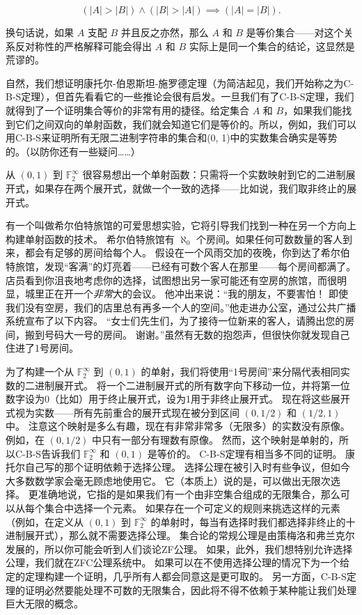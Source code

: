 \[ (|A| > |B|) \land (|B| > |A|) \implies (|A| = |B|).
\]

换句话说，如果 $A$ 支配 $B$ 并且反之亦然，那么 $A$ 和 $B$ 是等价集合——对这个关系反对称性的严格解释可能会得出 $A$ 和 $B$ 实际上是同一个集合的结论，这显然是荒谬的。

自然，我们想证明康托尔-伯恩斯坦-施罗德定理（为简洁起见，我们开始称之为C-B-S定理），但首先看看它的一些推论会很有启发。一旦我们有了C-B-S定理，我们就得到了一个证明集合等价的非常有用的捷径。给定集合 $A$ 和 $B$，如果我们能找到它们之间双向的单射函数，我们就会知道它们是等价的。所以，例如，我们可以用C-B-S来证明所有无限二进制字符串的集合和(0, 1)中的实数集合确实是等势的。（以防你还有一些疑问……）

从 $(0, 1)$ 到 ${\mathbb F}_2^\infty$ 很容易想出一个单射函数：只需将一个实数映射到它的二进制展开式，如果存在两个展开式，就做一个一致的选择——比如说，我们取非终止的展开式。

有一个叫做希尔伯特旅馆的可爱思想实验，它将引导我们找到一种在另一个方向上构建单射函数的技术。
希尔伯特旅馆有 $\aleph_0$ 个房间。如果任何可数数量的客人到来，都会有足够的房间给每个人。
假设在一个风雨交加的夜晚，你到达了希尔伯特旅馆，发现“客满”的灯亮着——已经有可数个客人在那里——每个房间都满了。
店员看到你沮丧地考虑你的选择，试图想出另一家可能还有空房的旅馆，而很明显，城里正在开一个\emph{非常}大的会议。
他冲出来说：“我的朋友，不要害怕！
即使我们没有空房，我们的店里总有再多一个人的空间。”他走进办公室，通过公共广播系统宣布了以下内容。
“女士们先生们，为了接待一位新来的客人，请腾出您的房间，搬到号码大一号的房间。
谢谢。”虽然有无数的抱怨声，但很快你就发现自己住进了1号房间。

为了构建一个从 ${\mathbb F}_2^\infty$ 到 $(0, 1)$ 的单射，我们将使用“1号房间”来分隔代表相同实数的二进制展开式。
将一个二进制展开式的所有数字向下移动一位，并将第一位数字设为0（比如）用于终止展开式，设为1用于非终止展开式。
现在将这些展开式视为实数——所有先前重合的展开式现在被分到区间 $(0, 1/2)$ 和 $(1/2, 1)$ 中。
注意这个映射是多么有趣，现在有非常非常多（无限多）的实数没有原像。
例如，在 $(0, 1/2)$ 中只有一部分有理数有原像。
然而，这个映射是单射的，所以C-B-S告诉我们 ${\mathbb F}_2^\infty$ 和 $(0, 1)$ 是等价的。
C-B-S定理有相当多不同的证明。
康托尔自己写的那个证明依赖于选择公理。
选择公理在被引入时有些争议，但如今大多数数学家会毫无顾虑地使用它。
它（本质上）说的是，可以做出无限次选择。
更准确地说，它指的是如果我们有一个由非空集合组成的无限集合，那么可以从每个集合中选择一个元素。
如果存在一个可定义的规则来挑选这样的元素（例如，在定义从 $(0, 1)$ 到 ${\mathbb F}_2^\infty$ 的单射时，每当有选择时我们都选择非终止的十进制展开式），那么就不需要选择公理。
集合论的常规公理是由策梅洛和弗兰克尔发展的，所以你可能会听到人们谈论ZF公理。
如果，此外，我们想特别允许选择公理，我们就在ZFC公理系统中。
如果可以在不使用选择公理的情况下为一个给定的定理构建一个证明，几乎所有人都会同意这是更可取的。
另一方面，C-B-S定理的证明必然要能处理不可数的无限集合，因此将不得不依赖于某种能让我们处理巨大无限的概念。

